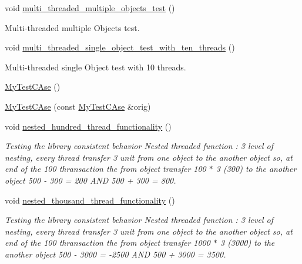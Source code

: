 \begin{DoxyCompactItemize}
void \hyperlink{class_my_test_c_ase_ae49b83ddf0fa297dbb8639001644fa5c_ae49b83ddf0fa297dbb8639001644fa5c}{multi\+\_\+threaded\+\_\+multiple\+\_\+objects\+\_\+test} ()
\begin{DoxyCompactList}\small\item\em 
\begin{DoxyEnumerate}
\item Multi-\/threaded multiple Objects test. 
\end{DoxyEnumerate}\end{DoxyCompactList}\item 
void \hyperlink{class_my_test_c_ase_afea0c5983bf1fcc38d8962cfa6277da4_afea0c5983bf1fcc38d8962cfa6277da4}{multi\+\_\+threaded\+\_\+single\+\_\+object\+\_\+test\+\_\+with\+\_\+ten\+\_\+threads} ()
\begin{DoxyCompactList}\small\item\em 
\begin{DoxyEnumerate}
\item Multi-\/threaded single Object test with 10 threads. 
\end{DoxyEnumerate}\end{DoxyCompactList}\item 
\hyperlink{class_my_test_c_ase_a17e7a9246f54f74dacf88f8d6556aa92_a17e7a9246f54f74dacf88f8d6556aa92}{My\+Test\+C\+Ase} ()
\item 
\hyperlink{class_my_test_c_ase_a742539c4ae7c357cc96295641d2c604d_a742539c4ae7c357cc96295641d2c604d}{My\+Test\+C\+Ase} (const \hyperlink{class_my_test_c_ase}{My\+Test\+C\+Ase} \&orig)
\item 
void \hyperlink{class_my_test_c_ase_a13635e729bf660619c7f6a75b414bc3f_a13635e729bf660619c7f6a75b414bc3f}{nested\+\_\+hundred\+\_\+thread\+\_\+functionality} ()
\begin{DoxyCompactList}\small\item\em Testing the library consistent behavior Nested threaded function \+: 3 level of nesting, every thread transfer 3 unit from one object to the another object so, at end of the 100 thransaction the from object transfer 100 $\ast$ 3 (300) to the another object 500 -\/ 300 = 200 A\+ND 500 + 300 = 800. \end{DoxyCompactList}\item 
void \hyperlink{class_my_test_c_ase_a3937532fe2a85f7e61518b8abffdb09a_a3937532fe2a85f7e61518b8abffdb09a}{nested\+\_\+thousand\+\_\+thread\+\_\+functionality} ()
\begin{DoxyCompactList}\small\item\em Testing the library consistent behavior Nested threaded function \+: 3 level of nesting, every thread transfer 3 unit from one object to the another object so, at end of the 100 thransaction the from object transfer 1000 $\ast$ 3 (3000) to the another object 500 -\/ 3000 = -\/2500 A\+ND 500 + 3000 = 3500. \end{DoxyCompactList}\item 

\end{DoxyCompactItemize}
